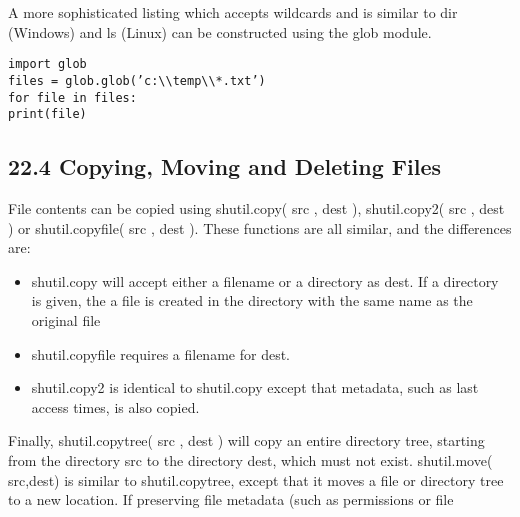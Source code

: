 \documentclass[KSmain.tex]{subfiles}
\begin{document}
A more sophisticated listing which accepts wildcards and is similar to dir (Windows) and ls (Linux)
can be constructed using the glob module.
\begin{framed}
\begin{verbatim}
import glob
files = glob.glob(’c:\\temp\\*.txt’)
for file in files:
print(file)
\end{verbatim}
\end{framed}
\subsection{22.4 Copying, Moving and Deleting Files}
File contents can be copied using shutil.copy( src , dest ), shutil.copy2( src , dest ) or shutil.copyfile(
src , dest ). These functions are all similar, and the differences are:
\begin{itemize}
\item shutil.copy will accept either a filename or a directory as dest. If a directory is given, the a file is
created in the directory with the same name as the original file
\item  shutil.copyfile requires a filename for dest.
\item  shutil.copy2 is identical to shutil.copy except that metadata, such as last access times, is also
copied.
\end{itemize}
Finally, shutil.copytree( src , dest ) will copy an entire directory tree, starting from the directory src to
the directory dest, which must not exist. shutil.move( src,dest) is similar to shutil.copytree, except that
it moves a file or directory tree to a new location. If preserving file metadata (such as permissions or file
\end{document}
